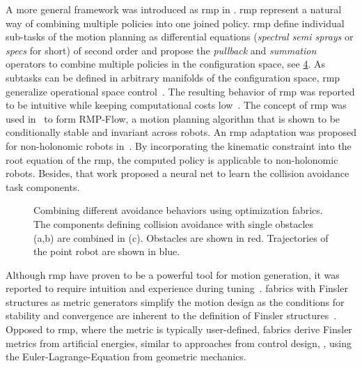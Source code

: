 %
A more general framework was introduced as \acf{rmp} in
\cite{Ratliff2018,Cheng2020,Li2021}. \Ac{rmp} represent a
natural way of combining multiple policies into one joined policy.
\ac{rmp} define individual sub-tasks of the motion planning as
differential equations (\textit{spectral semi sprays} or
\textit{specs} for short) of second order and propose the
\textit{pullback} and \textit{summation} operators to combine multiple policies
in the configuration space, see \cref{fig:spec_combination}. As subtasks can be defined in arbitrary manifolds
of the configuration space, \ac{rmp} generalize operational space
control~\cite{Khatib1987}. The resulting behavior of
\ac{rmp} was reported to be
intuitive while keeping computational costs low~\cite{Ratliff2018}. The concept
of \ac{rmp} was used in~\cite{Cheng2020,Cheng2020a} to form RMP-Flow, a motion
planning algorithm that is shown to be conditionally stable and invariant
across robots. An \ac{rmp} adaptation was proposed for non\hyp{}holonomic robots
in~\cite{Meng2019}. By incorporating the kinematic constraint into the root
equation of the \ac{rmp}, the computed policy is applicable to non\hyp{}holonomic robots.
Besides, that work proposed a neural net to learn the collision avoidance task
components. 
%
\begin{figure}[ht]
  \centering
  \begin{subfigure}{0.33\linewidth}
    \centering
    
    \caption{}
    \label{subfig:trajectory_obst1}
  \end{subfigure}%
  \begin{subfigure}{0.33\linewidth}
    \centering
    
    \caption{}
    \label{subfig:trajectory_obst2}
  \end{subfigure}%
  \begin{subfigure}{0.33\linewidth}
    \centering
    
    \caption{}
    \label{subfig:trajectory_both_obstacles}
  \end{subfigure}
  \caption{
    Combining different avoidance behaviors using optimization fabrics. The
    components defining collision avoidance with single obstacles (a,b) are
    combined in (c). Obstacles are shown in red. Trajectories of the point
    robot are shown in blue.
  }
  \label{fig:spec_combination}
\end{figure}
%

Although \ac{rmp} have proven to be a powerful tool for
motion generation, it was reported to require intuition and
experience during tuning~\cite{Ratliff2020}. \Acf{fabrics}
with Finsler structures as metric generators simplify the
motion design as the conditions for stability and
convergence are inherent to the definition of Finsler
structures~\cite{Ratliff2020,Ratliff2021,ratliff2023fabrics,van2022geometric}. Opposed to
\ac{rmp}, where the metric is typically user-defined,
fabrics derive Finsler metrics from artificial energies,
similar to approaches from control design, \cite{l2,l3},
using the Euler-Lagrange-Equation from geometric mechanics.

